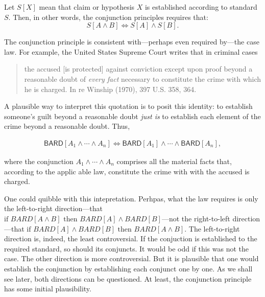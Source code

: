 \documentclass[10pt,dvipsnames,enabledeprecatedfontcommands]{scrartcl}
\newcommand{\et}{\wedge}
\begin{document}
\noindent Let \(S[X]\) mean that claim or hypothesis \(X\) is
established according to standard \(S\). Then, in other words, the
conjunction principles requires that:
\[S[A \wedge B] \Leftrightarrow S[A] \wedge S[B].\]

The conjunction principle is consistent with---perhaps even required
by---the case law. For example, the United States Supreme Court writes
that in criminal cases

\begin{quote}
the accused [is protected] against conviction except upon proof beyond a reasonable doubt of \textit{every fact} necessary to constitute the crime with which he is charged. In re Winship (1970), 397 U.S. 358, 364. 
\end{quote}

\noindent A plausible way to interpret this quotation is to posit this
identity: to establish someone's guilt beyond a reasonable doubt
\textit{just is} to establish each element of the crime beyond a
reasonable doubt. Thus,

\begin{align*}\mathsf{BARD}[A_1 \wedge \cdots \wedge A_n] \Leftrightarrow \mathsf{BARD}[A_1] \wedge \cdots \wedge \mathsf{BARD}[A_n],
\end{align*}

\noindent where the conjunction \(A_1 \et \cdots \et A_n\) comprises all
the material facts that, according to the applic able law, constitute
the crime with with the accused is
charged.

One could quibble with this intepretation. Perhpas, what the law
requires is only the left-to-right direction---that
\(\text{if }BARD[A \wedge B] \text{ then } BARD[A] \wedge BARD[B]\)---not
the right-to-left direction---that
\(\text{if } BARD[A] \wedge BARD[B] \text{ then }BARD[A \wedge B]\). The
left-to-right direction is, indeed, the least
controversial.
If the conjuction is established to the required standard, so should its
conjuncts.
It would be odd if this was not the case. The other direction is more
controversial. But it is plausible that one would establish
the conjunction by establishing each conjunct one by one. As we shall
see later, both directions can be questioned. At least, the conjunction
principle has some initial plausibility.
\end{document}

